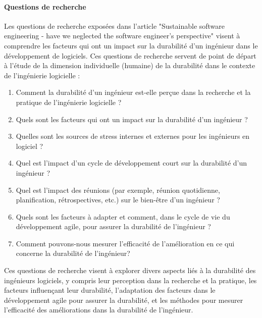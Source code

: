 \paragraph{Questions de recherche}
Les questions de recherche exposées dans l'article "Sustainable software engineering - have we neglected the software engineer's perspective" visent à comprendre les facteurs qui ont un impact sur la durabilité d'un ingénieur dans le développement de logiciels. Ces questions de recherche servent de point de départ à l'étude de la dimension individuelle (humaine) de la durabilité dans le contexte de l'ingénierie logicielle :

\begin{enumerate}
    \item Comment la durabilité d'un ingénieur est-elle perçue dans la recherche et la pratique de l'ingénierie logicielle ?
    \item Quels sont les facteurs qui ont un impact sur la durabilité d'un ingénieur ? 
        \item Quelles sont les sources de stress internes et externes pour les ingénieurs en logiciel ?
        \item Quel est l'impact d'un cycle de développement court sur la durabilité d'un ingénieur ?
        \item Quel est l'impact des réunions (par exemple, réunion quotidienne, planification, rétrospectives, etc.) sur le bien-être d'un ingénieur ?
    \item Quels sont les facteurs à adapter et comment, dans le cycle de vie du développement agile, pour assurer la durabilité de l'ingénieur ?
    \item Comment pouvons-nous mesurer l'efficacité de l'amélioration en ce qui concerne la durabilité de l'ingénieur?
\end{enumerate}
Ces questions de recherche visent à explorer divers aspects liés à la durabilité des ingénieurs logiciels, y compris leur perception dans la recherche et la pratique, les facteurs influençant leur durabilité, l'adaptation des facteurs dans le développement agile pour assurer la durabilité, et les méthodes pour mesurer l'efficacité des améliorations dans la durabilité de l'ingénieur.

